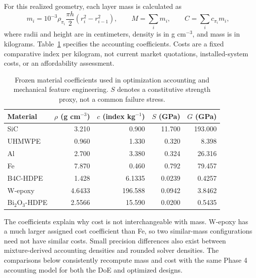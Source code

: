\documentclass[12pt]{elsarticle}
\begin{document}
For this realized geometry, each layer mass is calculated as
\begin{equation}
m_i=10^{-3}\rho_{\pi_i}\frac{\pi h}{2}(r_i^2-r_{i-1}^2),\qquad
M=\sum_i m_i,\qquad C=\sum_i c_{\pi_i}m_i,\label{eq:mass}
\end{equation}
where radii and height are in centimeters, density is in g cm$^{-3}$, and mass is in kilograms. Table~\ref{tab:materials} specifies the accounting coefficients. Costs are a fixed comparative index per kilogram, not current market quotations, installed-system costs, or an affordability assessment.
\begin{table}[H]\centering\small
\caption{Frozen material coefficients used in optimization accounting and mechanical feature engineering. $S$ denotes a constitutive strength proxy, not a common failure stress.}\label{tab:materials}
\begin{tabular}{@{}lrrrr@{}}\toprule
Material & $\rho$ (g cm$^{-3}$) & $c$ (index kg$^{-1}$) & $S$ (GPa) & $G$ (GPa)\\\midrule
SiC &3.210&0.900&11.700&193.000\\
UHMWPE &0.960&1.330&0.320&8.398\\
Al &2.700&3.380&0.324&26.316\\
Fe &7.870&0.460&0.792&79.457\\
B4C-HDPE &1.428&6.1335&0.0239&0.4257\\
W-epoxy &4.6433&196.588&0.0942&3.8462\\
Bi$_2$O$_3$-HDPE &2.5566&15.590&0.0200&0.5435\\\bottomrule
\end{tabular}\end{table}
The coefficients explain why cost is not interchangeable with mass. W-epoxy has a much larger assigned cost coefficient than Fe, so two similar-mass configurations need not have similar costs. Small precision differences also exist between mixture-derived accounting densities and rounded solver densities. The comparisons below consistently recompute mass and cost with the same Phase 4 accounting model for both the DoE and optimized designs.
\end{document}
